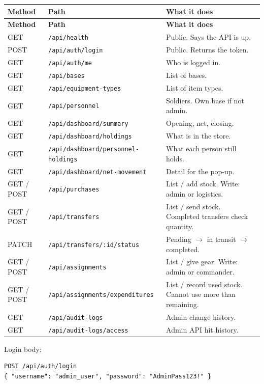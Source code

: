 \documentclass[11pt,a4paper]{article}
\begin{document}
\begin{center}
\small
\begin{longtable}{llp{6.8cm}}
\toprule
\textbf{Method} & \textbf{Path} & \textbf{What it does} \\
\midrule
\endfirsthead
\toprule
\textbf{Method} & \textbf{Path} & \textbf{What it does} \\
\midrule
\endhead
GET & \texttt{/api/health} & Public. Says the API is up. \\
POST & \texttt{/api/auth/login} & Public. Returns the token. \\
GET & \texttt{/api/auth/me} & Who is logged in. \\
GET & \texttt{/api/bases} & List of bases. \\
GET & \texttt{/api/equipment-types} & List of item types. \\
GET & \texttt{/api/personnel} & Soldiers. Own base if not admin. \\
GET & \texttt{/api/dashboard/summary} & Opening, net, closing. \\
GET & \texttt{/api/dashboard/holdings} & What is in the store. \\
GET & \texttt{/api/dashboard/personnel-holdings} & What each person still holds. \\
GET & \texttt{/api/dashboard/net-movement} & Detail for the pop-up. \\
GET / POST & \texttt{/api/purchases} & List / add stock. Write: admin or logistics. \\
GET / POST & \texttt{/api/transfers} & List / send stock. Completed transfers check quantity. \\
PATCH & \texttt{/api/transfers/:id/status} & Pending $\rightarrow$ in transit $\rightarrow$ completed. \\
GET / POST & \texttt{/api/assignments} & List / give gear. Write: admin or commander. \\
GET / POST & \texttt{/api/assignments/expenditures} & List / record used stock. Cannot use more than remaining. \\
GET & \texttt{/api/audit-logs} & Admin change history. \\
GET & \texttt{/api/audit-logs/access} & Admin API hit history. \\
\bottomrule
\end{longtable}
\end{center}

Login body:

\begin{lstlisting}
POST /api/auth/login
{ "username": "admin_user", "password": "AdminPass123!" }
\end{lstlisting}
\end{document}
